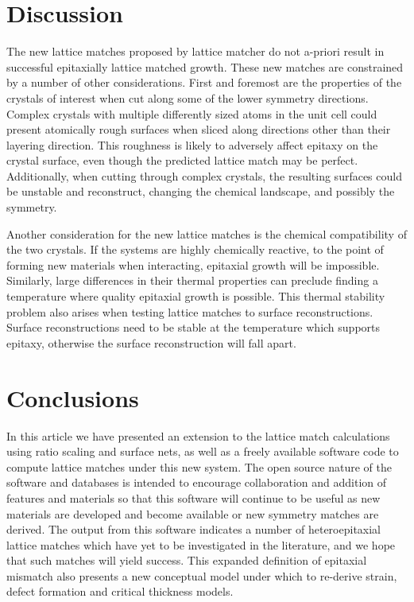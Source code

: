 \documentclass[final,5p,times,twocolumn]{elsarticle}
\begin{document}
\section{Discussion}
The new lattice matches proposed by lattice matcher do not a-priori result in successful epitaxially lattice matched growth. These new matches are constrained by a number of other considerations. First and foremost are the properties of the crystals of interest when cut along some of the lower symmetry directions. Complex crystals with multiple differently sized atoms in the unit cell could present atomically rough surfaces when sliced along directions other than their layering direction. This roughness is likely to adversely affect epitaxy on the crystal surface, even though the predicted lattice match may be perfect. Additionally, when cutting through complex crystals, the resulting surfaces could be unstable and reconstruct, changing the chemical landscape, and possibly the symmetry.

Another consideration for the new lattice matches is the chemical compatibility of the two crystals. If the systems are highly chemically reactive, to the point of forming new materials when interacting, epitaxial growth will be impossible. Similarly, large differences in their thermal properties can preclude finding a temperature where quality epitaxial growth is possible. This thermal stability problem also arises when testing lattice matches to surface reconstructions. Surface reconstructions need to be stable at the temperature which supports epitaxy, otherwise the surface reconstruction will fall apart.

\section{Conclusions}
In this article we have presented an extension to the lattice match calculations using ratio scaling and surface nets, as well as a freely available software code to compute lattice matches under this new system. The open source nature of the software and databases is intended to encourage collaboration and addition of features and materials so that this software will continue to be useful as new materials are developed and become available or new symmetry matches are derived. The output from this software indicates a number of heteroepitaxial lattice matches which have yet to be investigated in the literature, and we hope that such matches will yield success. This expanded definition of epitaxial mismatch also presents a new conceptual model under which to re-derive strain, defect formation and critical thickness models.
\end{document}
